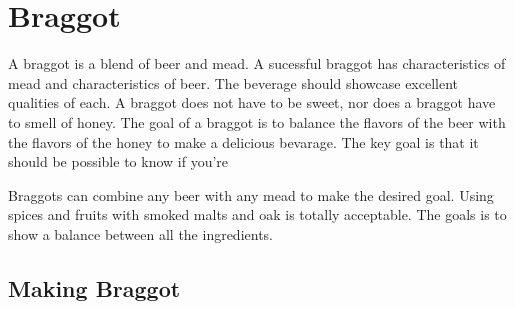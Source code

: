 \section{Braggot}
 A braggot is a blend of beer and mead. A sucessful braggot has characteristics of mead and characteristics of beer.
 The beverage should showcase excellent qualities of each.
 A braggot does not have to be sweet, nor does a braggot have to smell
 of honey. The goal of a braggot is to balance the flavors of the beer with the flavors of the honey to make a 
 delicious bevarage. The key goal is that it should be possible to know if you're

 Braggots can combine any beer with any mead to make the desired goal. Using spices
 and fruits with smoked malts and oak is totally acceptable. The goals is to show a balance between all 
 the ingredients.

 \subsection{Making Braggot}